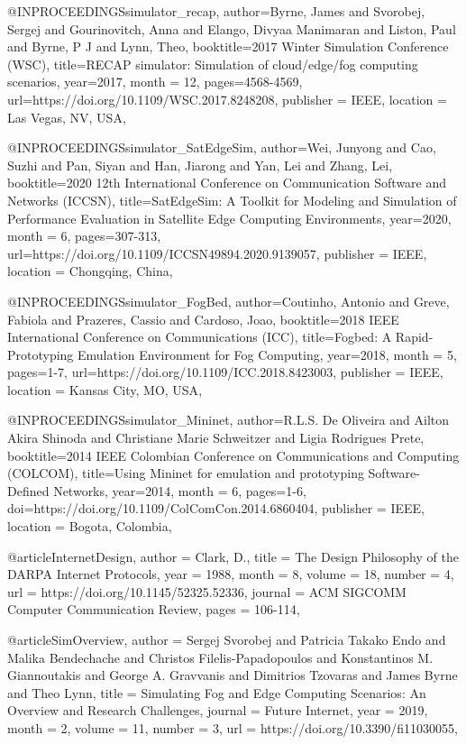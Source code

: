 \documentclass[english,version-2019-11]{uzl-thesis}
\begin{document}
\begin{bibtex-entries}
@INPROCEEDINGS{simulator_recap,
  author={Byrne, James and Svorobej, Sergej and Gourinovitch, Anna and Elango, Divyaa Manimaran and Liston, Paul and Byrne, P J and Lynn, Theo},
  booktitle={2017 Winter Simulation Conference (WSC)}, 
  title={RECAP simulator: Simulation of cloud/edge/fog computing scenarios}, 
  year={2017},
  month = {12},
  pages={4568-4569},
  url={https://doi.org/10.1109/WSC.2017.8248208},
  publisher = {IEEE},
  location = {Las Vegas, NV, USA},
}

@INPROCEEDINGS{simulator_SatEdgeSim,
  author={Wei, Junyong and Cao, Suzhi and Pan, Siyan and Han, Jiarong and Yan, Lei and Zhang, Lei},
  booktitle={2020 12th International Conference on Communication Software and Networks (ICCSN)}, 
  title={SatEdgeSim: A Toolkit for Modeling and Simulation of Performance Evaluation in Satellite Edge Computing Environments}, 
  year={2020},
  month = {6},
  pages={307-313},
  url={https://doi.org/10.1109/ICCSN49894.2020.9139057},
  publisher = {IEEE},
  location = {Chongqing, China},
}

@INPROCEEDINGS{simulator_FogBed,
  author={Coutinho, Antonio and Greve, Fabiola and Prazeres, Cassio and Cardoso, Joao},
  booktitle={2018 IEEE International Conference on Communications (ICC)}, 
  title={Fogbed: A Rapid-Prototyping Emulation Environment for Fog Computing}, 
  year={2018},
  month = {5},
  pages={1-7},
  url={https://doi.org/10.1109/ICC.2018.8423003},
  publisher = {IEEE},
  location = {Kansas City, MO, USA},
}

@INPROCEEDINGS{simulator_Mininet,
  author={R.L.S. {De Oliveira} and Ailton Akira Shinoda and Christiane Marie Schweitzer and Ligia Rodrigues Prete},
  booktitle={2014 IEEE Colombian Conference on Communications and Computing (COLCOM)}, 
  title={Using Mininet for emulation and prototyping Software-Defined Networks}, 
  year={2014},
  month = {6},
  pages={1-6},
  doi={https://doi.org/10.1109/ColComCon.2014.6860404},
  publisher = {IEEE},
  location = {Bogota, Colombia},
}




@article{InternetDesign,
    author = {Clark, D.},
    title = {The Design Philosophy of the DARPA Internet Protocols},
    year = {1988},
    month = {8},
    volume = {18},
    number = {4},
    url = {https://doi.org/10.1145/52325.52336},
    journal = {ACM SIGCOMM Computer Communication Review},
    pages = {106-114},
}

@article{SimOverview,
    author  = {Sergej Svorobej and Patricia Takako Endo and Malika Bendechache and Christos Filelis-Papadopoulos and Konstantinos M. Giannoutakis and George A. Gravvanis and Dimitrios Tzovaras and James Byrne and Theo Lynn},
    title   = {Simulating Fog and Edge Computing Scenarios: An Overview and Research Challenges},
    journal = {Future Internet},
    year    = {2019},
    month   = {2},
    volume  = {11},
    number  = {3},
    url     = {https://doi.org/10.3390/fi11030055},
}
    

\end{bibtex-entries}
\end{document}
